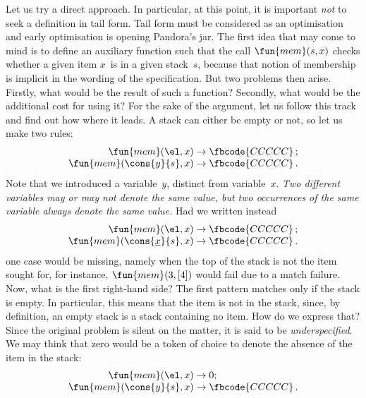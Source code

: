 Let us try a direct approach. In particular, at this point, it is
important \emph{not} to seek a definition in tail form. Tail form must
be considered as an optimisation and early optimisation is opening
Pandora's jar. The first idea that may come to mind is to define an
auxiliary function  such that the call \(\fun{mem}(s,x)\)
checks whether a given item \(x\)~is in a given stack~\(s\), because
that notion of membership is implicit in the wording of the
specification. But two problems then arise. Firstly, what would be the
result of such a function? Secondly, what would be the additional cost
for using it? For the sake of the argument, let us follow this track
and find out how where it leads. A stack can either be empty or not,
so let us make two rules:
\begin{equation*}
\begin{array}{r@{\;}c@{\;}l}
\fun{mem}(\el,x) & \rightarrow & \fbcode{CCCCC}\,;\\
\fun{mem}(\cons{y}{s},x) & \rightarrow & \fbcode{CCCCC}\,.
\end{array}
\end{equation*}
Note that we introduced a variable~\(y\), distinct from
variable~\(x\). \emph{Two different variables may or may not denote
  the same value, but two occurrences of the same variable always
  denote the same value.} Had we written instead
\begin{equation*}
\begin{array}{r@{\;}c@{\;}l}
\fun{mem}(\el,x) & \rightarrow & \fbcode{CCCCC}\,;\\
\fun{mem}(\cons{\underline{x}}{s},x) & \rightarrow & \fbcode{CCCCC}\,.
\end{array}
\end{equation*}
one case would be missing, namely when the top of the stack is not the
item sought for, for instance, \(\fun{mem}(3,[4])\) would fail due to
a match failure. Now, what is the first right\hyp{}hand side? The
first pattern matches only if the stack is empty. In particular, this
means that the item is not in the stack, since, by definition, an
empty stack is a stack containing no item. How do we express that?
Since the original problem is silent on the matter, it is said to be
\emph{underspecified}. We may think that
zero would be a token of choice to denote the absence of the item in
the stack:
\begin{equation*}
\begin{array}{r@{\;}c@{\;}l}
\fun{mem}(\el,x) & \rightarrow & 0;\\
\fun{mem}(\cons{y}{s},x) & \rightarrow & \fbcode{CCCCC}\,.
\end{array}
\end{equation*}
